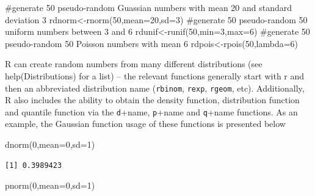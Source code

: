 \documentclass[
  letterpaper,
  DIV=11,
  numbers=noendperiod]{scrartcl}
\newenvironment{Shaded}{\begin{snugshade}}{\end{snugshade}}
\newcommand{\AttributeTok}[1]{\textcolor[rgb]{0.40,0.45,0.13}{#1}}
\newcommand{\CommentTok}[1]{\textcolor[rgb]{0.37,0.37,0.37}{#1}}
\newcommand{\DecValTok}[1]{\textcolor[rgb]{0.68,0.00,0.00}{#1}}
\newcommand{\FunctionTok}[1]{\textcolor[rgb]{0.28,0.35,0.67}{#1}}
\newcommand{\NormalTok}[1]{\textcolor[rgb]{0.00,0.23,0.31}{#1}}
\newcommand{\OtherTok}[1]{\textcolor[rgb]{0.00,0.23,0.31}{#1}}
\begin{document}
\begin{Shaded}
\begin{Highlighting}[]
\CommentTok{\#generate 50 pseudo{-}random Guassian numbers with mean 20 and standard deviation 3}
\NormalTok{rdnorm}\OtherTok{\textless{}{-}}\FunctionTok{rnorm}\NormalTok{(}\DecValTok{50}\NormalTok{,}\AttributeTok{mean=}\DecValTok{20}\NormalTok{,}\AttributeTok{sd=}\DecValTok{3}\NormalTok{)}
\CommentTok{\#generate 50 pseudo{-}random  50 uniform numbers between 3 and 6}
\NormalTok{rdunif}\OtherTok{\textless{}{-}}\FunctionTok{runif}\NormalTok{(}\DecValTok{50}\NormalTok{,}\AttributeTok{min=}\DecValTok{3}\NormalTok{,}\AttributeTok{max=}\DecValTok{6}\NormalTok{)}
\CommentTok{\#generate 50 pseudo{-}random  50 Poisson numbers with mean 6}
\NormalTok{rdpois}\OtherTok{\textless{}{-}}\FunctionTok{rpois}\NormalTok{(}\DecValTok{50}\NormalTok{,}\AttributeTok{lambda=}\DecValTok{6}\NormalTok{)}
\end{Highlighting}
\end{Shaded}

R can create random numbers from many different distributions (see
help(Distributions) for a list) -- the relevant functions generally
start with r and then an abbreviated distribution name (\texttt{rbinom},
\texttt{rexp}, \texttt{rgeom}, etc). Additionally, R also includes the
ability to obtain the density function, distribution function and
quantile function via the \texttt{d}+name, \texttt{p}+name and
\texttt{q}+name functions. As an example, the Gaussian function usage of
these functions is presented below

\begin{Shaded}
\begin{Highlighting}[]
\FunctionTok{dnorm}\NormalTok{(}\DecValTok{0}\NormalTok{,}\AttributeTok{mean=}\DecValTok{0}\NormalTok{,}\AttributeTok{sd=}\DecValTok{1}\NormalTok{)}
\end{Highlighting}
\end{Shaded}

\begin{verbatim}
[1] 0.3989423
\end{verbatim}

\begin{Shaded}
\begin{Highlighting}[]
\FunctionTok{pnorm}\NormalTok{(}\DecValTok{0}\NormalTok{,}\AttributeTok{mean=}\DecValTok{0}\NormalTok{,}\AttributeTok{sd=}\DecValTok{1}\NormalTok{)}
\end{Highlighting}
\end{Shaded}
\end{document}

